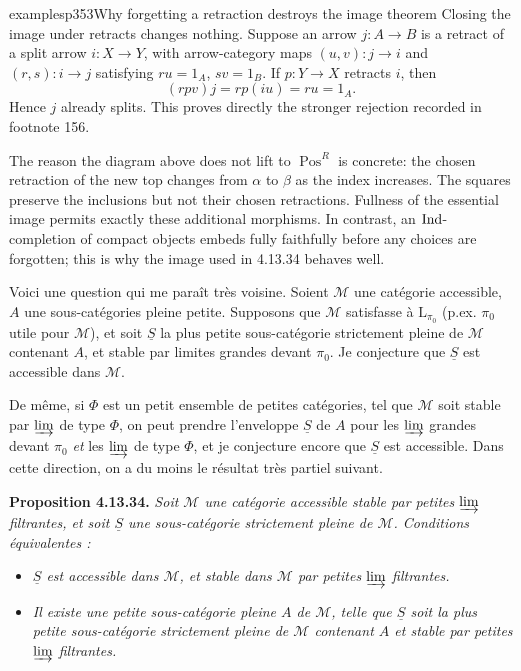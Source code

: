 \begin{dcomment}{examples}{p353}{Why forgetting a retraction destroys the image theorem}
Closing the image under retracts changes nothing. Suppose an arrow $j:A\to B$ is a retract of a split arrow $i:X\to Y$, with arrow-category maps $(u,v):j\to i$ and $(r,s):i\to j$ satisfying $ru=1_A$, $sv=1_B$. If $p:Y\to X$ retracts $i$, then
\[
 (rpv)j=rp(iu)=ru=1_A.
\]
Hence $j$ already splits. This proves directly the stronger rejection recorded in footnote 156.

The reason the diagram above does not lift to $\operatorname{Pos}^{R}$ is concrete: the chosen retraction of the new top changes from $\alpha$ to $\beta$ as the index increases. The squares preserve the inclusions but not their chosen retractions. Fullness of the essential image permits exactly these additional morphisms. In contrast, an $\operatorname{Ind}$-completion of compact objects embeds fully faithfully before any choices are forgotten; this is why the image used in 4.13.34 behaves well.
\end{dcomment}


Voici une question qui me paraît très voisine. Soient $\mathcal{M}$ une catégorie accessible, $A$ une sous-catégories pleine petite. Supposons que $\mathcal{M}$ satisfasse à $\mathrm{L}_{\pi_0}$ (p.ex. $\pi_0$ utile pour $\mathcal{M}$), et soit $\underline{S}$ la plus petite sous-catégorie strictement pleine de $\mathcal{M}$ contenant $A$, et stable par limites grandes devant $\pi_0$. Je conjecture que $\underline{S}$ est accessible dans $\mathcal{M}$. %


De même, si $\Phi$ est un petit ensemble de petites catégories, tel que $\mathcal{M}$ soit stable par $\varinjlim$ de type $\Phi$, on peut prendre l'enveloppe $\underline{S}$ de $A$ pour les $\varinjlim$ grandes devant $\pi_0$ \textit{et} les
$\varinjlim$ de type $\Phi$, et je conjecture encore que $\underline{S}$ est accessible. Dans cette direction, on a du moins le résultat très partiel suivant.

\textbf{Proposition 4.13.34.} \textit{Soit $\mathcal{M}$ une catégorie accessible stable par petites $\varinjlim$ filtrantes, et soit $\underline{S}$ une sous-catégorie strictement pleine de $\mathcal{M}$. Conditions équivalentes :}
\begin{itemize}[leftmargin=2.5em]
\item[\textit{a)}] \textit{$\underline{S}$ est accessible dans $\mathcal{M}$, et stable dans $\mathcal{M}$ par petites $\varinjlim$ filtrantes.}
\item[\textit{b)}] \textit{Il existe une petite sous-catégorie pleine $A$ de $\mathcal{M}$, telle que $\underline{S}$ soit la plus petite sous-catégorie strictement pleine de $\mathcal{M}$ contenant $A$ et stable par petites $\varinjlim$ filtrantes.}
\end{itemize}


